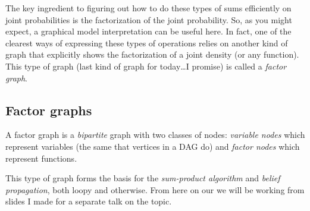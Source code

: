 \documentclass[11pt]{article}
\begin{document}
The key ingredient to figuring out how to do these types of sums efficiently
on joint probabilities is the factorization of the
joint probability. So, as you might expect, a graphical model interpretation can be useful
here. In fact, one of the clearest ways of expressing these types of operations relies
on another kind of graph that explicitly shows the factorization of a joint density 
(or any function).  This type of graph (last kind of graph for today\ldots I promise)
is called a {\em factor graph}.

\subsection{Factor graphs}
A factor graph is a {\em bipartite} graph with two classes of nodes: {\em variable nodes} which
represent variables (the same that vertices in a DAG do) and {\em factor nodes} which represent
functions.  

This type of graph forms the basis for the {\em sum-product algorithm}  and {\em belief propagation},
both loopy and otherwise.   From here on our we will be working from slides I made for a
separate talk on the topic.




\end{document}
